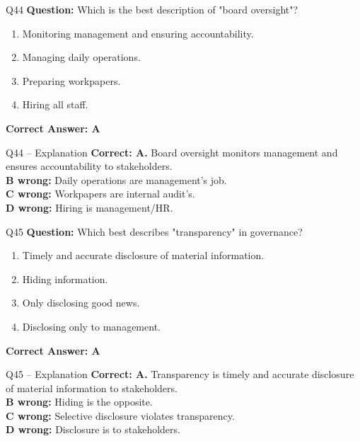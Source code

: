 \documentclass[aspectratio=169,10pt]{beamer}
\begin{document}
	\begin{frame}[t]{Q44}
		\small
		\textbf{Question:} Which is the best description of "board oversight"?
		\begin{enumerate}[label=\Alph*.,itemsep=1pt,topsep=2pt]
			\item Monitoring management and ensuring accountability.
			\item Managing daily operations.
			\item Preparing workpapers.
			\item Hiring all staff.
		\end{enumerate}
		\vspace{4pt}
		\textbf{Correct Answer: A}
	\end{frame}
	
	\begin{frame}[t]{Q44 -- Explanation}
		\small
		\textbf{Correct: A.} Board oversight monitors management and ensures accountability to stakeholders. \\[4pt]
		\textbf{B wrong:} Daily operations are management's job. \\[2pt]
		\textbf{C wrong:} Workpapers are internal audit's. \\[2pt]
		\textbf{D wrong:} Hiring is management/HR.
	\end{frame}
	
	\begin{frame}[t]{Q45}
		\small
		\textbf{Question:} Which best describes "transparency" in governance?
		\begin{enumerate}[label=\Alph*.,itemsep=1pt,topsep=2pt]
			\item Timely and accurate disclosure of material information.
			\item Hiding information.
			\item Only disclosing good news.
			\item Disclosing only to management.
		\end{enumerate}
		\vspace{4pt}
		\textbf{Correct Answer: A}
	\end{frame}
	
	\begin{frame}[t]{Q45 -- Explanation}
		\small
		\textbf{Correct: A.} Transparency is timely and accurate disclosure of material information to stakeholders. \\[4pt]
		\textbf{B wrong:} Hiding is the opposite. \\[2pt]
		\textbf{C wrong:} Selective disclosure violates transparency. \\[2pt]
		\textbf{D wrong:} Disclosure is to stakeholders.
	\end{frame}
	
\end{document}
